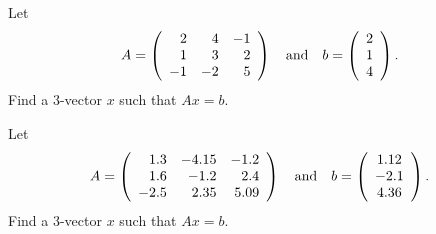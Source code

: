 \documentclass{ximera}
\begin{document}
\begin{exercise} \label{c4.1.10}
Let
\begin{equation*}
A = \left(\begin{array}{rrr} 2 & 4 & -1 \\ 1 & 3 & 2\\
-1 & -2 & 5 \end{array}\right) \quad\mbox{and}\quad
b = \left(\begin{array}{c} 2 \\ 1 \\ 4 \end{array}\right).
\end{equation*}
Find a $3$-vector $x$ such that $Ax=b$.
\end{exercise}

\begin{exercise} \label{c4.1.11}
Let
\begin{equation*}
A = \left(\begin{array}{rrr} 1.3 & -4.15 & -1.2 \\ 1.6 & -1.2 & 2.4\\
-2.5 & 2.35 & 5.09 \end{array}\right) \quad\mbox{and}\quad
b = \left(\begin{array}{c} 1.12 \\ -2.1 \\ 4.36 \end{array}\right).
\end{equation*}
Find a $3$-vector $x$ such that $Ax=b$.
\end{exercise}
\end{document}

